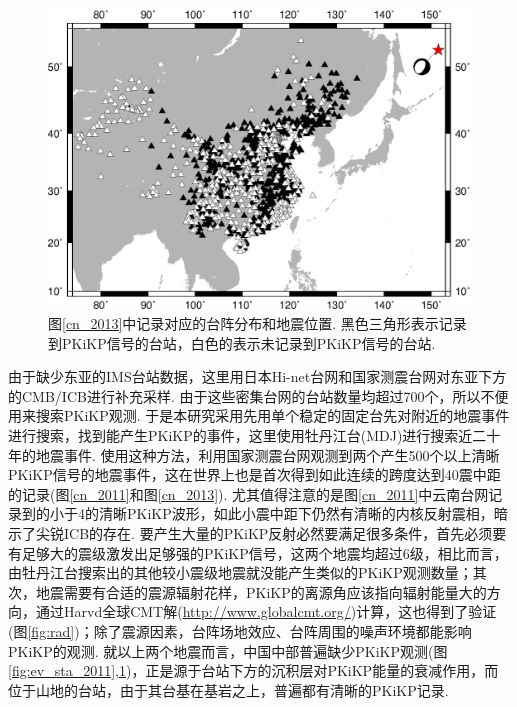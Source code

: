 \begin{figure}
\centering
\includegraphics[width=0.8\linewidth]{fig/chap2/ev_sta_2013}
\caption{图\ref{cn_2013}中记录对应的台阵分布和地震位置. 黑色三角形表示记录到PKiKP信号的台站，白色的表示未记录到PKiKP信号的台站.}
\label{fig:ev_sta_2013}
\end{figure}

由于缺少东亚的IMS台站数据，这里用日本Hi-net台网和国家测震台网对东亚下方的CMB/ICB进行补充采样. 由于这些密集台网的台站数量均超过700个，所以不便用来搜索PKiKP观测. 于是本研究采用先用单个稳定的固定台先对附近的地震事件进行搜索，找到能产生PKiKP的事件，这里使用牡丹江台(MDJ)进行搜索近二十年的地震事件. 使用这种方法，利用国家测震台网观测到两个产生500个以上清晰PKiKP信号的地震事件，这在世界上也是首次得到如此连续的跨度达到40{\textdegree}震中距的记录(图\ref{cn_2011}和图\ref{cn_2013}). 尤其值得注意的是图\ref{cn_2011}中云南台网记录到的小于4{\textdegree}的清晰PKiKP波形，如此小震中距下仍然有清晰的内核反射震相，暗示了尖锐ICB的存在. 要产生大量的PKiKP反射必然要满足很多条件，首先必须要有足够大的震级激发出足够强的PKiKP信号，这两个地震均超过6级，相比而言，由牡丹江台搜索出的其他较小震级地震就没能产生类似的PKiKP观测数量；其次，地震需要有合适的震源辐射花样，PKiKP的离源角应该指向辐射能量大的方向，通过Harvd全球CMT解(\url{http://www.globalcmt.org/})计算，这也得到了验证(图\ref{fig:rad})；除了震源因素，台阵场地效应、台阵周围的噪声环境都能影响PKiKP的观测. 就以上两个地震而言，中国中部普遍缺少PKiKP观测(图\ref{fig:ev_sta_2011},\ref{fig:ev_sta_2013})，正是源于台站下方的沉积层对PKiKP能量的衰减作用，而位于山地的台站，由于其台基在基岩之上，普遍都有清晰的PKiKP记录.


 

